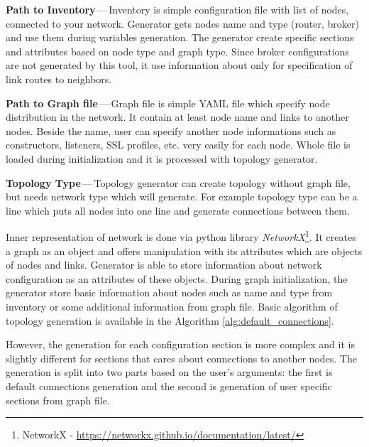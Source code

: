\begin{description}
	\item \textbf{Path to Inventory}\,---\,Inventory is simple configuration file with list of nodes, connected to your network. Generator gets nodes name and type (router, broker) and use them during variables generation. The generator create specific sections and attributes based on node type and graph type. Since broker configurations are not generated by this tool, it use information about only for specification of link routes to neighbors. 
	\item \textbf{Path to Graph file}\,---\,Graph file is simple YAML file which specify node distribution in the network. It contain at least node name and links to another nodes. Beside the name, user can specify another node informations such as constructors, listeners, SSL profiles, etc. very easily for each node. Whole file is loaded during initialization and it is processed with topology generator.
	\item \textbf{Topology Type}\,---\,Topology generator can create topology without graph file, but needs network type which will generate. For example topology type can be a line which puts all nodes into one line and generate connections between them.
\end{description}

Inner representation of network is done via python library \emph{NetworkX}\footnote{NetworkX - \url{https://networkx.github.io/documentation/latest/}}. It creates a graph as an object and offers manipulation with its attributes which are objects of nodes and links. Generator is able to store information about network configuration as an attributes of these objects. During graph initialization, the generator store basic information about nodes such as name and type from inventory or some additional information from graph file. Basic algorithm of topology generation is available in the Algorithm \ref{alg:default_connections}.

However, the generation for each configuration section is more complex and it is slightly different for sections that cares about connections to another nodes. The generation is split into two parts based on the user's arguments: the first is default connections generation and the second is generation of user specific sections from graph file.


